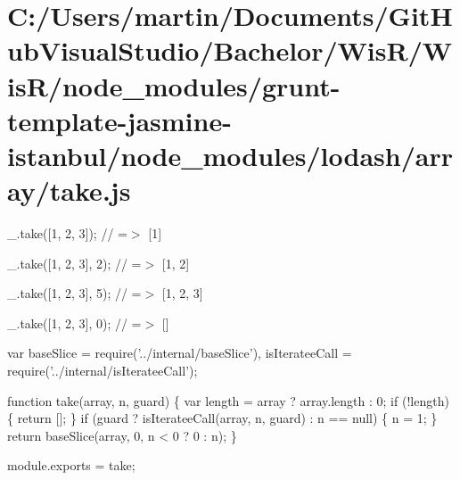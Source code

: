 \hypertarget{_c_1_2_users_2martin_2_documents_2_git_hub_visual_studio_2_bachelor_2_wis_r_2_wis_r_2node_modulebe43734bea91ede1ee0541359ad37711}{}\section{C\+:/\+Users/martin/\+Documents/\+Git\+Hub\+Visual\+Studio/\+Bachelor/\+Wis\+R/\+Wis\+R/node\+\_\+modules/grunt-\/template-\/jasmine-\/istanbul/node\+\_\+modules/lodash/array/take.\+js}
\+\_\+.\+take(\mbox{[}1, 2, 3\mbox{]}); // =$>$ \mbox{[}1\mbox{]}

\+\_\+.\+take(\mbox{[}1, 2, 3\mbox{]}, 2); // =$>$ \mbox{[}1, 2\mbox{]}

\+\_\+.\+take(\mbox{[}1, 2, 3\mbox{]}, 5); // =$>$ \mbox{[}1, 2, 3\mbox{]}

\+\_\+.\+take(\mbox{[}1, 2, 3\mbox{]}, 0); // =$>$ \mbox{[}\mbox{]}


\begin{DoxyCodeInclude}
var baseSlice = require(\textcolor{stringliteral}{'../internal/baseSlice'}),
    isIterateeCall = require(\textcolor{stringliteral}{'../internal/isIterateeCall'});

\textcolor{keyword}{function} take(array, n, guard) \{
  var length = array ? array.length : 0;
  \textcolor{keywordflow}{if} (!length) \{
    \textcolor{keywordflow}{return} [];
  \}
  \textcolor{keywordflow}{if} (guard ? isIterateeCall(array, n, guard) : n == null) \{
    n = 1;
  \}
  \textcolor{keywordflow}{return} baseSlice(array, 0, n < 0 ? 0 : n);
\}

module.exports = take;
\end{DoxyCodeInclude}
 